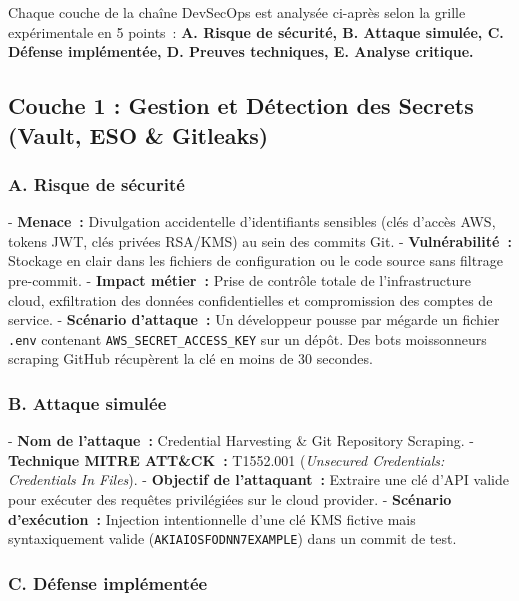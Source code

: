 Chaque couche de la chaîne DevSecOps est analysée ci-après selon la grille expérimentale en 5 points~: \textbf{A. Risque de sécurité, B. Attaque simulée, C. Défense implémentée, D. Preuves techniques, E. Analyse critique.}

\subsection{Couche 1 : Gestion et Détection des Secrets (Vault, ESO \& Gitleaks)}
\subsubsection{A. Risque de sécurité}
- \textbf{Menace~:} Divulgation accidentelle d'identifiants sensibles (clés d'accès AWS, tokens JWT, clés privées RSA/KMS) au sein des commits Git.
- \textbf{Vulnérabilité~:} Stockage en clair dans les fichiers de configuration ou le code source sans filtrage pre-commit.
- \textbf{Impact métier~:} Prise de contrôle totale de l'infrastructure cloud, exfiltration des données confidentielles et compromission des comptes de service.
- \textbf{Scénario d'attaque~:} Un développeur pousse par mégarde un fichier \texttt{.env} contenant \texttt{AWS\_SECRET\_ACCESS\_KEY} sur un dépôt. Des bots moissonneurs scraping GitHub récupèrent la clé en moins de 30 secondes.

\subsubsection{B. Attaque simulée}
- \textbf{Nom de l'attaque~:} Credential Harvesting \& Git Repository Scraping.
- \textbf{Technique MITRE ATT\&CK~:} T1552.001 (\textit{Unsecured Credentials: Credentials In Files}).
- \textbf{Objectif de l'attaquant~:} Extraire une clé d'API valide pour exécuter des requêtes privilégiées sur le cloud provider.
- \textbf{Scénario d'exécution~:} Injection intentionnelle d'une clé KMS fictive mais syntaxiquement valide (\texttt{AKIAIOSFODNN7EXAMPLE}) dans un commit de test.

\subsubsection{C. Défense implémentée}

\vspace{0.3cm}
